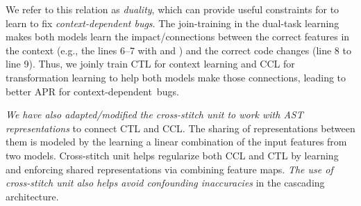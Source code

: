 We refer to this relation as {\em duality}, which can provide useful
constraints for {\tool} to learn to fix {\em context-dependent
  bugs}.
The join-training in the dual-task learning makes both models learn
the impact/connections between the correct features in the context
(e.g., the lines 6--7 with  and )
and the correct code changes (line 8 to line 9). Thus, we
joinly train CTL for context learning and CCL for transformation
learning to help both models make those connections, leading to better
APR for context-dependent~bugs.


{\em We have also adapted/modified the cross-stitch
    unit \cite{misra2016cross} to work with AST representations} to
connect CTL and CCL. The sharing of representations between them is
modeled by the learning a linear combination of the input features
from two models. Cross-stitch unit helps regularize both CCL and CTL
by learning and enforcing shared representations via combining feature
maps.
{\em The use of cross-stitch unit also helps avoid confounding
  inaccuracies} in the cascading architecture.

